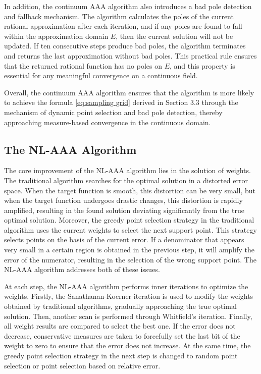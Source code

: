 \documentclass[12pt,a4paper]{article}  %
\theoremstyle{definition}
\numberwithin{equation}{section}
\begin{document}
In addition, the continuum AAA algorithm also introduces a bad pole detection and fallback mechanism. The algorithm calculates the poles of the current rational approximation after each iteration, and if any poles are found to fall within the approximation domain
$E$, then the current solution will not be updated. If ten consecutive steps produce bad poles, the algorithm terminates and returns the last approximation without bad poles. This practical rule ensures that the returned rational function has no poles on $E$, and this property is essential for any meaningful convergence on a continuous field.

Overall, the continuum AAA algorithm ensures that the algorithm is more likely to achieve the formula \ref{eq:sampling grid} derived in Section 3.3 through the mechanism of dynamic point selection and bad pole detection, thereby approaching measure-based convergence in the continuous domain.

\subsection{The NL-AAA Algorithm}
The core improvement of the NL-AAA algorithm lies in the solution of weights. The traditional algorithm searches for the optimal solution in a distorted error space. When the target function is smooth, this distortion can be very small, but when the target function undergoes drastic changes, this distortion is rapidly amplified, resulting in the found solution deviating significantly from the true optimal solution. Moreover, the greedy point selection strategy in the traditional algorithm uses the current weights to select the next support point. This strategy selects points on the basis of the current error. If a denominator that appears very small in a certain region is obtained in the previous step, it will amplify the error of the numerator, resulting in the selection of the wrong support point. The NL-AAA algorithm addresses both of these issues.

At each step, the NL-AAA algorithm performs inner iterations to optimize the weights. Firstly, the Sanathanan-Koerner iteration is used to modify the weights obtained by traditional algorithms, gradually approaching the true optimal solution. Then, another scan is performed through Whitfield's iteration. Finally, all weight results are compared to select the best one. If the error does not decrease, conservative measures are taken to forcefully set the last bit of the weight to zero to ensure that the error does not increase. At the same time, the greedy point selection strategy in the next step is changed to random point selection or point selection based on relative error.
\end{document}
